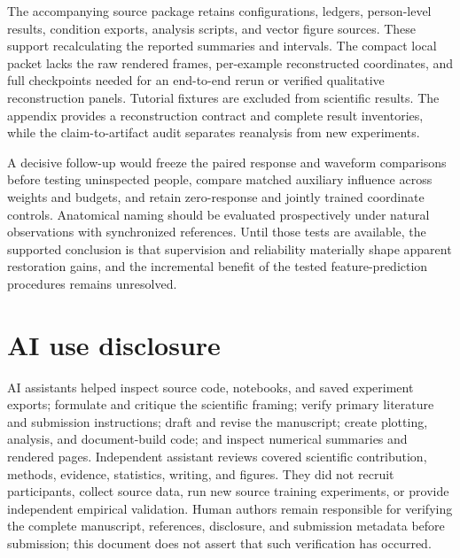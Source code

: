 \documentclass{article}
\begin{document}
The accompanying source package retains configurations, ledgers, person-level results, condition exports, analysis scripts, and vector figure sources. These support recalculating the reported summaries and intervals. The compact local packet lacks the raw rendered frames, per-example reconstructed coordinates, and full checkpoints needed for an end-to-end rerun or verified qualitative reconstruction panels. Tutorial fixtures are excluded from scientific results. The appendix provides a reconstruction contract and complete result inventories, while the claim-to-artifact audit separates reanalysis from new experiments.

A decisive follow-up would freeze the paired response and waveform comparisons before testing uninspected people, compare matched auxiliary influence across weights and budgets, and retain zero-response and jointly trained coordinate controls. Anatomical naming should be evaluated prospectively under natural observations with synchronized references. Until those tests are available, the supported conclusion is that supervision and reliability materially shape apparent restoration gains, and the incremental benefit of the tested feature-prediction procedures remains unresolved.

\label{maintextend}
\clearpage
\section*{AI use disclosure}
AI assistants helped inspect source code, notebooks, and saved experiment exports; formulate and critique the scientific framing; verify primary literature and submission instructions; draft and revise the manuscript; create plotting, analysis, and document-build code; and inspect numerical summaries and rendered pages. Independent assistant reviews covered scientific contribution, methods, evidence, statistics, writing, and figures. They did not recruit participants, collect source data, run new source training experiments, or provide independent empirical validation. Human authors remain responsible for verifying the complete manuscript, references, disclosure, and submission metadata before submission; this document does not assert that such verification has occurred.


\clearpage
\appendix

\end{document}
